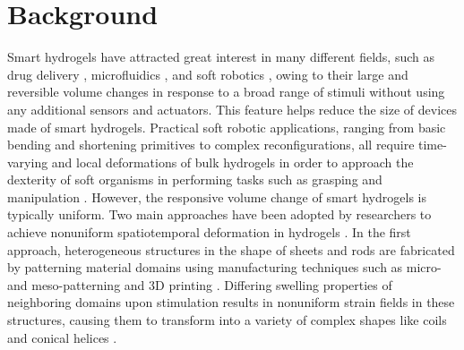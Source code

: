 \section{Background}
Smart hydrogels have attracted great interest in many different fields, such as drug delivery ,               
microfluidics , and soft robotics , owing to their large and reversible volume changes in response to a broad range of stimuli without using any additional sensors and actuators. This feature helps reduce the size of devices made of smart hydrogels. 
Practical soft robotic applications, ranging from basic bending and shortening primitives to complex reconfigurations, all require time-varying and local deformations of bulk hydrogels in order to approach the dexterity of 
soft organisms in performing tasks such as grasping and manipulation .
However, the responsive volume change of smart hydrogels is typically uniform.
Two main approaches have been adopted by researchers to achieve nonuniform spatiotemporal deformation in hydrogels . In the first approach, heterogeneous structures in the shape of sheets and rods are fabricated by patterning material domains using manufacturing techniques such as micro- and meso-patterning  and 3D printing . Differing swelling properties of neighboring domains upon stimulation results in nonuniform strain fields in these structures, causing them to transform into a variety of complex shapes like coils and conical helices .
